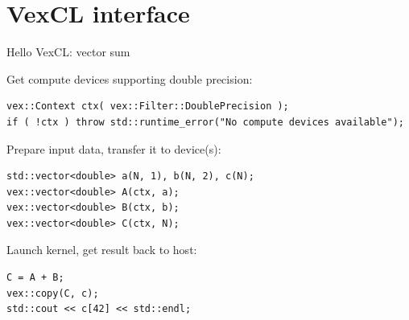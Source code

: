 \documentclass[@BEAMER_OPTIONS@]{beamer}
\begin{document}

\section{VexCL interface}
\begin{frame}
    \sectionpage
\end{frame}

\note{}

\begin{frame}[fragile]{Hello VexCL: vector sum}
    \begin{exampleblock}{Get compute devices supporting double precision:}
        \begin{lstlisting}
vex::Context ctx( vex::Filter::DoublePrecision );
if ( !ctx ) throw std::runtime_error("No compute devices available");
        \end{lstlisting}
    \end{exampleblock}
    \begin{exampleblock}{Prepare input data, transfer it to device(s):}
        \begin{lstlisting}[firstnumber=last]
std::vector<double> a(N, 1), b(N, 2), c(N);
vex::vector<double> A(ctx, a);
vex::vector<double> B(ctx, b);
vex::vector<double> C(ctx, N);
        \end{lstlisting}
    \end{exampleblock}
    \begin{exampleblock}{Launch kernel, get result back to host:}
        \begin{lstlisting}[firstnumber=last]
C = A + B;
vex::copy(C, c);
std::cout << c[42] << std::endl;
        \end{lstlisting}
    \end{exampleblock}
\end{frame}
\end{document}
